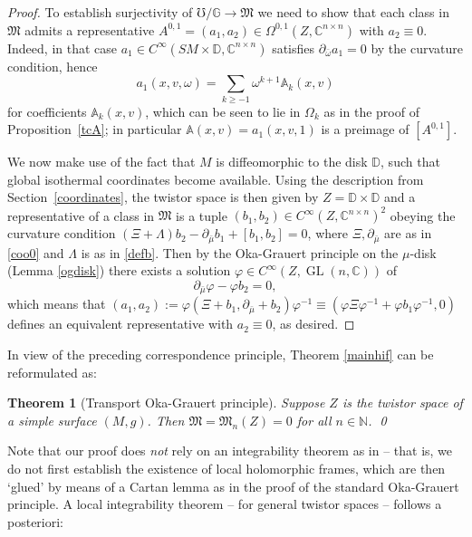 \documentclass[JEP,XML,SOM,Unicode,published]{cedram}
\DeclareMathOperator{\GL}{GL}
\theoremstyle{plain}
\newtheorem{theorem}{Theorem}[section]
\theoremstyle{definition}
\newcommand{\A}{\mathbb{A}}
\newcommand{\G}{\mathbb{G}}
\newcommand{\N}{\mathbb{N}}
\newcommand{\C}{\mathbb{C}}
\newcommand{\DD}{\mathbb{D}}
\newcommand{\M}{\mathfrak{M}}
\newcommand{\1}{{\bf 1}}
\begin{document}
\begin{proof}
To establish surjectivity of $\mho/\G\to \M$ we need to show that each class in $\M$ admits a representative $A^{0,1}=(a_1,a_2)\in \Omega^{0,1}(Z,\C^{n\times n})$ with $a_2\equiv 0$. Indeed, in that case $a_1\in C^\infty(SM\times \DD,\C^{n\times n})$ satisfies $\partial_{\bar \omega}a_1=0$ by the curvature condition, hence
\begin{equation*}
a_1(x,v,\omega) = \sum_{k\ge -1} \omega^{k+1} \A_k(x,v)
\end{equation*}
for coefficients $\A_k(x,v)$, which can be seen to lie in $\Omega_k$ as in the proof of Proposition~\ref{tcA}; in particular $\A(x,v)=a_1(x,v,1)$ is a preimage of $[A^{0,1}]$.

We now make use of the fact that $M$ is diffeomorphic to the disk $\DD$, such that global isothermal coordinates become available. Using the description from Section~\ref{coordinates}, the twistor space is then given by $Z=\DD\times \DD$ and a representative of a class in $\M$ is a tuple $(b_1,b_2)\in C^\infty(Z,\C^{n\times n})^2$ obeying the curvature condition $(\Xi+\Lambda) b_2 - \partial_{\bar \mu} b_1 +[b_1,b_2]= 0 $, where $\Xi,\partial_{\bar \mu}$ are as in \eqref{coo0} and $\Lambda$ is as in \eqref{defb}.
Then by the Oka-Grauert principle on the $\mu$-disk (Lemma \ref{ogdisk}) there exists a solution $\varphi\in C^\infty(Z,\GL(n,
\C))$ of
\begin{equation*}
\partial_{\bar \mu} \varphi - \varphi b_2 = 0,
\end{equation*}
which means that
$
(a_1,a_2):=\varphi(\Xi + b_1, \partial_{\bar \mu} + b_2) \varphi^{-1}\equiv \left(\varphi \Xi \varphi^{-1} + \varphi b_1 \varphi^{-1},0\right)
$
defines an equivalent representative with $a_2\equiv 0$, as desired.
\end{proof}

In view of the preceding correspondence principle, Theorem \ref{mainhif} can be reformulated as:

\begin{theorem}[Transport Oka-Grauert principle]\label{tog} Suppose $Z$ is the twistor space of a simple surface $(M,g)$. Then $\M=\M_n(Z)=0$ for all $n\in \N$. \qed
\end{theorem}

Note that our proof does \emph{not} rely on an integrability theorem as in \cite[Th.\,2.1.53]{DoKr90} -- that is, we do not first establish the existence of local holomorphic frames, which are then `glued' by means of a Cartan lemma as in the proof of the standard Oka-Grauert principle. A local integrability theorem -- for general twistor spaces -- follows a posteriori:
\end{document}
